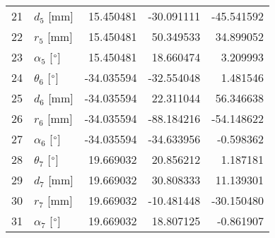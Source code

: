 \documentclass{standalone}%
\begin{document}
\begin{tabular}{llrrr}
21 &              $d_{5}$ [mm] &  15.450481 &  -30.091111 &  -45.541592 \\
22 &              $r_{5}$ [mm] &  15.450481 &   50.349533 &   34.899052 \\
23 &  $\alpha_{5}$ [$\degree$] &  15.450481 &   18.660474 &    3.209993 \\
24 &  $\theta_{6}$ [$\degree$] & -34.035594 &  -32.554048 &    1.481546 \\
25 &              $d_{6}$ [mm] & -34.035594 &   22.311044 &   56.346638 \\
26 &              $r_{6}$ [mm] & -34.035594 &  -88.184216 &  -54.148622 \\
27 &  $\alpha_{6}$ [$\degree$] & -34.035594 &  -34.633956 &   -0.598362 \\
28 &  $\theta_{7}$ [$\degree$] &  19.669032 &   20.856212 &    1.187181 \\
29 &              $d_{7}$ [mm] &  19.669032 &   30.808333 &   11.139301 \\
30 &              $r_{7}$ [mm] &  19.669032 &  -10.481448 &  -30.150480 \\
31 &  $\alpha_{7}$ [$\degree$] &  19.669032 &   18.807125 &   -0.861907 \\
\bottomrule
\end{tabular}
%
\end{document}
